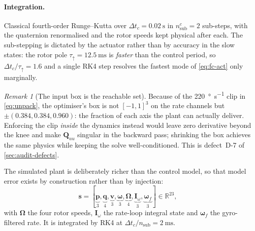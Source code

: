 \documentclass[11pt,a4paper,twoside,openright]{report}
\makeatletter
\renewcommand{\subsection}{\FloatBarrier\old@subsection}}
\newcommand{\R}{\mathbb{R}}
\renewcommand{\vec}[1]{\bm{#1}}
\newcommand{\mat}[1]{\bm{#1}}
\newcommand{\plantstate}{\vec{s}}
\newcommand{\quat}{\vec{q}}
\newcommand{\bodyrate}{\vec{\omega}}
\theoremstyle{plain}
\theoremstyle{definition}
\theoremstyle{remark}
\newtheorem{remark}[theorem]{Remark}
\DeclareRobustCommand{\nbd}{\mbox{-}}
\makeatother
\begin{document}
	\paragraph{Integration.} Classical fourth-order Runge--Kutta over
	$\Delta t_c=\SI{0.02}{\second}$ in $n^{c}_\mathrm{sub}=2$ sub-steps, with the
	quaternion renormalised and the rotor speeds kept physical after each. The
	sub-stepping is dictated by the actuator rather than by accuracy in the slow
	states: the rotor pole $\tau_\uparrow=\SI{12.5}{\milli\second}$ is \emph{faster}
	than the control period, so $\Delta t_c/\tau_\uparrow=1.6$ and a single RK4 step
	resolves the fastest mode of \cref{eq:fc-act} only marginally.

	\begin{remark}[The input box is the reachable set]
		Because of the \SI{220}{\degree\per\second} clip in \cref{eq:unpack}, the
		optimiser's box is not $[-1,1]^3$ on the rate channels but
		$\pm(0.384,0.384,0.960)$: the fraction of each axis the plant can actually
		deliver. Enforcing the clip \emph{inside} the dynamics instead would leave zero
		derivative beyond the knee and make $\mat Q_{uu}$ singular in the backward pass;
		shrinking the box achieves the same physics while keeping the solve
		well-conditioned. This is defect~D\nbd 7 of \cref{sec:audit-defects}.
	\end{remark}

	\subsection{Plant model (\texorpdfstring{$23$}{23} states)}

	The simulated plant is deliberately richer than the control model, so that model
	error exists by construction rather than by injection:
	\[
	\plantstate=[\underbrace{\vec p}_{3},\underbrace{\quat}_{4},\underbrace{\vec v}_{3},
	\underbrace{\bodyrate}_{3},\underbrace{\vec\Omega}_{4},
	\underbrace{\vec I_\omega}_{3},\underbrace{\bodyrate_f}_{3}]\in\R^{23},
	\]
	with $\vec\Omega$ the four rotor speeds, $\vec I_\omega$ the rate-loop integral
	state and $\bodyrate_f$ the gyro-filtered rate. It is integrated by RK4 at
	$\Delta t_c/n_\mathrm{sub}=\SI{2}{\milli\second}$.
\end{document}
